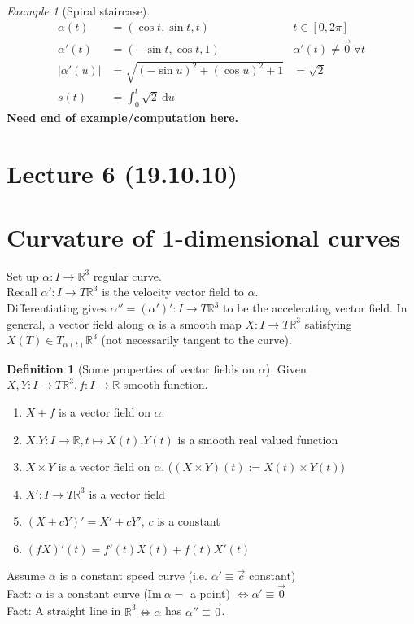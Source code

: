 \documentclass{article}
\renewcommand{\d}{\mathrm{d}}
\newcommand{\R}{\mathbb{R}}
\newcommand{\im}{\mathrm{Im}\ }
\theoremstyle{definition}
\newtheorem{definition}{Definition}[section]
\theoremstyle{remark}
\theoremstyle{example}
\newtheorem*{example}{Example}
\begin{document}
	\begin{example}[Spiral staircase]
		\begin{align*}
			\alpha(t)&=(\cos t, \sin t, t) & t \in [0, 2\pi]\\
			\alpha'(t)&=(-\sin t,\cos t, 1) & \alpha'(t) \neq \vec{0}\ \forall t\\
			|\alpha'(u)|&=\sqrt{(-\sin u)^2 + (\cos u)^2 + 1} & = \sqrt{2}\\
			s(t)&=\int_{0}^{t}\sqrt{2}\ \d u
		\end{align*}
		\textbf{Need end of example/computation here.}
	\end{example}

	\section*{Lecture 6 (19.10.10)}
	\section{Curvature of 1-dimensional curves}
	Set up $\alpha:I \to \R^3$ regular curve.\\
	Recall $\alpha':I \to T \R^3$ is the velocity vector field to $\alpha$.\\
	Differentiating gives $\alpha''=(\alpha')':I \to T \R^3$ to be the accelerating vector field.
	In general, a vector field along $\alpha$ is a smooth map $X : I \to T \R^3$ satisfying $X(T) \in T_{\alpha(t)} \R^3$ (not necessarily tangent to the curve).
	\begin{definition}[Some properties of vector fields on $\alpha$]
		Given $X,Y:I \to T\R^3,f:I \to \R$ smooth function.
		\begin{enumerate}
			\item $X+f$ is a vector field on $\alpha$.\\
			\item $X.Y:I \to \R,t \mapsto X(t).Y(t)$ is a smooth real valued function
			\item $X \times Y$ is a vector field on $\alpha$, ($(X \times Y)(t):=X(t)\times Y(t)$)
			\item $X':I \to T \R^3$ is a vector field
			\item $(X+cY)'=X'+cY'$, $c$ is a constant
			\item $(fX)'(t)=f'(t)X(t)+f(t)X'(t)$
		\end{enumerate}
	\end{definition}
	Assume $\alpha$ is a constant speed curve (i.e. $\alpha'\equiv\vec{c}$ constant)\\
	Fact: $\alpha$ is a constant curve ($\im \alpha = $ a point) $\iff \alpha' \equiv \vec{0}$\\
	Fact: A straight line in $\R^3 \iff \alpha$ has $\alpha''\equiv\vec{0}$.
	
\end{document}
